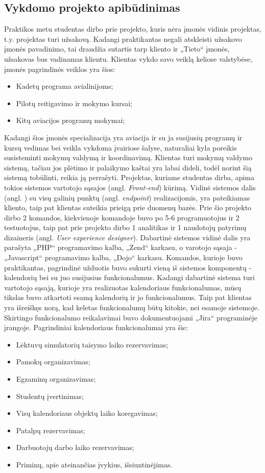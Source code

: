 \documentclass{VUMIFPSbakalaurinis}
\begin{document}
\subsection{Vykdomo projekto apibūdinimas}
Praktikos metu studentas dirbo prie projekto, kuris nėra įmonės vidinis projektas, t.y. projektas turi užsakovą. Kadangi praktikantas negali atskleisti užsakovo įmonės pavadinimo, tai draudžia sutartis tarp kliento ir „Tieto“ įmonės, užsakovas bus vadinamas klientu. Klientas vykdo savo veiklą keliose valstybėse, įmonės pagrindinės veiklos yra šios:
\begin{itemize}
    \item Kadetų programa avialinijoms;
    \item Pilotų reitigavimo ir mokymo kursai;
    \item Kitų aviacijos programų mokymai;
\end{itemize}
Kadangi šios įmonės specializacija yra aviacija ir su ja susijusių programų ir kursų vedimas bei veikla vykdoma įvairiose šalyse, naturaliai kyla poreikis susisteminti mokymų valdymą ir koordinavimą. Klientas turi mokymų valdymo sistemą, tačiau jos plėtimo ir palaikymo kaštai yra labai dideli, todėl norint šią sistemą tobūlinti, reikia ją perrašyti. Projektas, kuriame studentas dirba, apima tokios sistemos vartotojo sąsajos (angl. \textit{Front-end}) kūrimą. Vidinė sistemos dalis (angl. ) su visų galinių punktų (angl. \textit{endpoint}) realizacijomis, yra pateikiamas kliento, taip pat klientas suteikia prieigą prie duomenų bazės. Prie šio projekto dirbo 2 komandos, kiekvienoje komandoje buvo po 5-6 programuotojus ir 2 testuotojus, taip pat prie projekto dirbo 1 analitikas ir 1 naudotojų patyrimų dizaineris (angl. \textit{User experience designer}). Dabartinė sistemos vidinė dalis yra parašyta „PHP“ programavimo kalba, „Zend“ karkasu, o varotojo sąsaja - „Javascript“ programavimo kalba, „Dojo“ karkasu. Komandos, kurioje buvo praktikantas, pagrindinė užduotis buvo sukurti vieną iš sistemos komponentų - kalendorių bei su juo susijusius funkcionalumus. Kadangi dabartinė sistema turi vartotojo sąsają, kurioje yra realizuotas kalendoriaus funkcionalumas, mūsų tikslas buvo atkartoti esamą kalendorių ir jo funkcionalumus. Taip pat klientas yra išreiškęs norą, kad keletas funkcionalumų būtų kitokie, nei esamoje sistemoje. Skirtingo funkcionalumo reikalavimai buvo dokumentuojami „Jira“ programinėje įrangoje. Pagrindiniai kalendoriaus funkcionalumai yra šie:
\begin{itemize}
    \item Lėktuvų simulatorių taisymo laiko rezervavimas;
    \item Pamokų organizavimas;
    \item Egzaminų organizavimas;
    \item Studentų įvertinimas;
    \item Visų kalendoriaus objektų laiko koregavimas;
    \item Patalpų rezervavimas;
    \item Darbuotojų darbo laiko rezervavimas;
    \item Priminų, apie ateinančias įvykius, išsiuntinėjimas.
\end{itemize}
\end{document}

